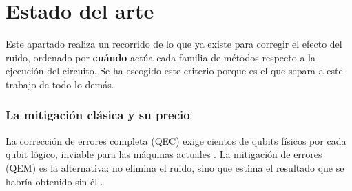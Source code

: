 \section{Estado del arte}
\label{cap:sota}
%
%
%
%
%
%
%

Este apartado realiza un recorrido de lo que ya existe para corregir el efecto del ruido, ordenado por
\textbf{cuándo} actúa cada familia de métodos respecto a la ejecución del circuito. Se ha
escogido este criterio porque es el que separa
a este trabajo de todo lo demás.

\subsubsection*{La mitigación clásica y su precio}

La corrección de errores completa (QEC) exige cientos de qubits físicos por cada qubit lógico,
inviable para las máquinas actuales \cite{preskill2018nisq}. La mitigación de errores (QEM) es
la alternativa: no elimina el ruido, sino que estima el resultado que se habría obtenido sin él
\cite{cai2023quantum}.

